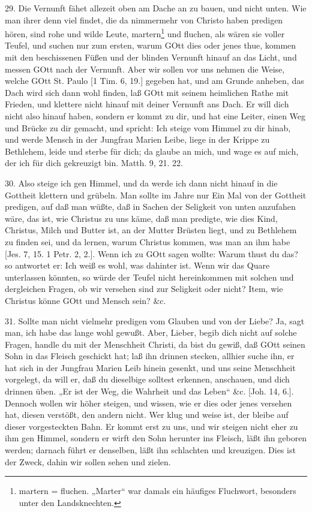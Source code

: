 29. Die Vernunft fähet allezeit oben am Dache an zu bauen, und nicht unten. Wie man ihrer denn viel findet, die da nimmermehr von Christo haben predigen hören, sind rohe und wilde Leute, martern\footnote{martern = fluchen. „Marter“ war damals ein häufiges Fluchwort, besonders unter den Landsknechten.} und fluchen, als wären sie voller Teufel, und suchen nur zum ersten, warum GOtt dies oder jenes thue, kommen mit den beschissenen Füßen und der blinden Vernunft hinauf an das Licht, und messen GOtt nach der Vernunft. Aber wir sollen vor uns nehmen die Weise, welche GOtt St. Paulo [1 Tim. 6, 19.] gegeben hat, und am Grunde anheben, das Dach wird sich dann wohl finden, laß GOtt mit seinem heimlichen Rathe mit Frieden, und klettere nicht hinauf mit deiner Vernunft ans Dach. Er will dich nicht also hinauf haben, sondern er kommt zu dir, und hat eine Leiter, einen Weg und Brücke zu dir gemacht, und spricht: Ich steige vom Himmel zu dir hinab, und werde Mensch in der Jungfrau Marien Leibe, liege in der Krippe zu Bethlehem, leide und sterbe für dich; da glaube an mich, und wage es auf mich, der ich für dich gekreuzigt bin. Matth. 9, 21. 22.

30. Also steige ich gen Himmel, und da werde ich dann nicht hinauf in die Gottheit klettern und grübeln. Man sollte im Jahre nur Ein Mal von der Gottheit predigen, auf daß man wüßte, daß in Sachen der Seligkeit von unten anzufahen wäre, das ist, wie Christus zu uns käme, daß man predigte, wie dies Kind, Christus, Milch und Butter ist, an der Mutter Brüsten liegt, und zu Bethlehem zu finden sei, und da lernen, warum Christus kommen, was man an ihm habe [Jes. 7, 15. 1 Petr. 2, 2.]. Wenn ich zu GOtt sagen wollte: Warum thust du das? so antwortet er: Ich weiß es wohl, was dahinter ist. Wenn wir das Quare unterlassen könnten, so würde der Teufel nicht hereinkommen mit solchen und dergleichen Fragen, ob wir versehen sind zur Seligkeit oder nicht? Item, wie Christus könne GOtt und Mensch sein? \&c.

31. Sollte man nicht vielmehr predigen vom Glauben und von der Liebe? Ja, sagt man, ich habe das lange wohl gewußt. Aber, Lieber, begib dich nicht auf solche Fragen, handle du mit der Menschheit Christi, da bist du gewiß, daß GOtt seinen Sohn in das Fleisch geschickt hat; laß ihn drinnen stecken, allhier suche ihn, er hat sich in der Jungfrau Marien Leib hinein gesenkt, und uns seine Menschheit vorgelegt, da will er, daß du dieselbige solltest erkennen, anschauen, und dich drinnen üben. „Er ist der Weg, die Wahrheit und das Leben“ \&c. [Joh. 14, 6.]. Dennoch wollen wir höher steigen, und wissen, wie er dies oder jenes versehen hat, diesen verstößt, den andern nicht. Wer klug und weise ist, der bleibe auf dieser vorgesteckten Bahn. Er kommt erst zu uns, und wir steigen nicht eher zu ihm gen Himmel, sondern er wirft den Sohn herunter ins Fleisch, läßt ihn geboren werden; darnach führt er denselben, läßt ihn schlachten und kreuzigen. Dies ist der Zweck, dahin wir sollen sehen und zielen.


